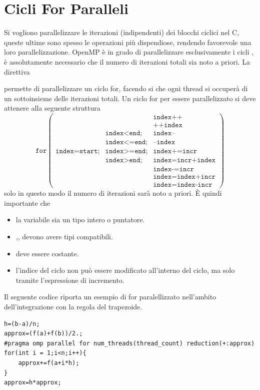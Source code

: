 \documentclass[10pt, letterpaper]{report}
\begin{document}
\section{Cicli For Paralleli}
Si vogliono parallelizzare le iterazioni (indipendenti) dei blocchi ciclici nel C, queste ultime sono spesso le operazioni più dispendiose, rendendo favorevole una loro parallelizzazione. OpenMP è in grado di parallelizzare esclusivamente i cicli , è assolutamente necessario che il numero di iterazioni totali sia noto a priori. La direttiva \begin{quote}
\end{quote}
permette di parallelizzare un ciclo for, facendo si che ogni thread si occuperà di un sottoinsieme delle iterazioni totali. Un ciclo for per essere parallelizzato si deve attenere alla seguente struttura 
$$ \texttt{for}\begin{pmatrix}
    &&\texttt{index++}\\ 
    &&\texttt{++index}\\ 
    &\texttt{index<end;}&\texttt{index--}\\ 
    &\texttt{index<=end;}&\texttt{--index}\\ 
    \texttt{index=start;}&\texttt{index>=end;}&\texttt{index+=incr}\\ 
    &\texttt{index>end;}&\texttt{index=incr+index}\\ 
    &&\texttt{index-=incr}\\ 
    &&\texttt{index=index+incr}\\
    &&\texttt{index=index-incr}
\end{pmatrix}$$
solo in questo modo il numero di iterazioni sarà noto a priori. È quindi importante che\begin{itemize}
    \item la variabile  sia un tipo intero o puntatore. 
    \item {},, devono avere tipi compatibili. 
    \item {} deve essere costante. 
    \item l'indice del ciclo  non può essere modificato all'interno del ciclo, ma solo tramite l'espressione di incremento.
\end{itemize} Il seguente codice riporta un esempio di for paralellizzato nell'ambito dell'integrazione con la regola del trapezoide.
\begin{lstlisting}[style=CStyle]
h=(b-a)/n;
approx=(f(a)+f(b))/2.;
#pragma omp parallel for num_threads(thread_count) reduction(+:approx)
for(int i = 1;i<n;i++){
    approx+=f(a+i*h);
}
approx=h*approx;
\end{lstlisting}
\end{document}

